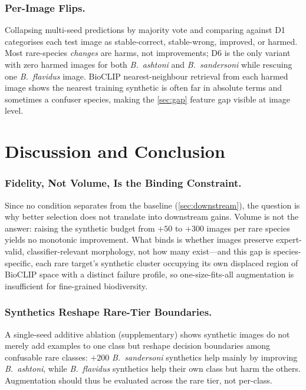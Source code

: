 \documentclass[runningheads]{llncs}
\begin{document}
\subsubsection{Per-Image Flips.}
Collapsing multi-seed predictions by majority vote and comparing against
D1 categorises each test image as stable-correct, stable-wrong,
improved, or harmed. Most rare-species \emph{changes} are harms, not
improvements; D6 is the only variant with zero harmed images for both
\emph{B.~ashtoni} and \emph{B.~sandersoni} while rescuing one
\emph{B.~flavidus} image. BioCLIP nearest-neighbour retrieval from each
harmed image shows the nearest training synthetic is often far in
absolute terms and sometimes a confuser species, making the
\cref{sec:gap} feature gap visible at image level.


\section{Discussion and Conclusion}
\label{sec:discussion}

\subsubsection{Fidelity, Not Volume, Is the Binding Constraint.}
Since no condition separates from the baseline (\cref{sec:downstream}),
the question is why better selection does not translate into downstream
gains. Volume is not the answer: raising the synthetic budget from $+50$
to $+300$ images per rare species yields no monotonic improvement. What
binds is whether images preserve expert-valid, classifier-relevant
morphology, not how many exist---and this gap is species-specific, each
rare target's synthetic cluster occupying its own displaced region of
BioCLIP space with a distinct failure profile, so one-size-fits-all
augmentation is insufficient for fine-grained biodiversity.

\subsubsection{Synthetics Reshape Rare-Tier Boundaries.}
A single-seed additive ablation (supplementary) shows synthetic images
do not merely add examples to one class but reshape decision boundaries
among confusable rare classes: $+200$ \emph{B.~sandersoni} synthetics
help mainly by improving \emph{B.~ashtoni}, while \emph{B.~flavidus}
synthetics help their own class but harm the others. Augmentation should
thus be evaluated across the rare tier, not per-class.
\end{document}
